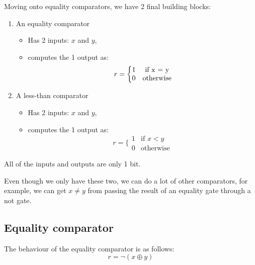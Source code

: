\documentclass[11pt,a4paper,titlepage,dvipsnames,cmyk]{scrartcl}
\begin{document}
Moving onto equality comparators, we have 2 final building blocks:
\begin{enumerate}
    \item An equality comparator
        \begin{itemize}
            \item Has 2 inputs: $x$ and $y$,
            \item computes the 1 output as:
                \begin{equation*}
                    r = \bigg \{
                   \begin{matrix}
                       1 & \text{if } $x = y$ \\
                       0 & \text{otherwise}
                   \end{matrix}
                \end{equation*}
        \end{itemize}
    \item A less-than comparator
        \begin{itemize}
            \item Has 2 inputs: $x$ and $y$,
            \item computes the 1 output as:
                \begin{equation*}
                    r = \bigg \{
                        \begin{matrix}
                            1 & \text{if } x < y \\
                            0 & \text{otherwise}
                        \end{matrix}
                \end{equation*}
        \end{itemize}
\end{enumerate}

All of the inputs and outputs are only 1 bit.

Even though we only have these two, we can do a lot of other comparators,
for example, we can get $x \neq y$ from passing the result of an equality
gate through a not gate.

\subsection{Equality comparator}%
\label{sub:equality}
The behaviour of the equality comparator is as follows:
\begin{equation*}
    r = \neg (x \oplus y)
\end{equation*}
\end{document}
